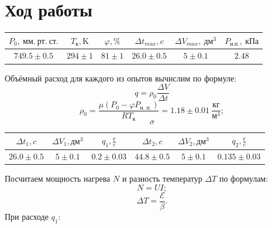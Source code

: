\documentclass[a4paper, 12pt]{article}%
\begin{document}
\section{Ход работы}
\begin{center}

\begin{tabular}{|c|c|c|c|c|c|}
\hline $P_0,\ \text{мм}.\ \text{рт}.\ \text{ст}. $ & $T_{\text{к}}, \text{K}$ & $\varphi, \%$ & $\Delta t_{max}, c$ & $\Delta V_{max},\ \text{дм}^3$ & $P_{\text{н.п.}},\ \text{кПа}$ \\\hline
 $749.5 \pm 0.5$ & $294 \pm 1$ & $81 \pm 1$ & $26.0 \pm 0.5$ & $5 \pm 0.1$ & $2.48$ \\\hline
\end{tabular}
\end{center}
Объёмный расход для каждого из опытов вычислим по формуле:
\[
	q = \rho_0 \frac{\Delta V}{\Delta t}
\]
\[
	\rho_0 = \frac{\mu \left(P_0 - \varphi P_{\text{н. п.}} \right)}{RT_\text{к}} = 1.18 \pm 0.01\ \frac{\text{кг}}{\text{м}^3};
\]
\[
	\sigma
\]

\begin{center}

\begin{tabular}{|c|c|c|c|c|c|}
\hline $\Delta t_1, c$ & $\Delta V_1, \text{дм}^3$ & $q_1, \frac{\text{г}}{c}$ & $\Delta t_2, c$ & $\Delta V_2, \text{дм}^3$ & $q_2, \frac{\text{г}}{c}$ \\\hline
 $26.0 \pm 0.5$ & $5 \pm 0.1$ & $0.2 \pm 0.03$ & $44.8 \pm 0.5$ & $5 \pm 0.1$ & $0.135 \pm 0.03$ \\\hline
\end{tabular}
\end{center}

Посчитаем мощность нагрева $N$ и разность температур $\Delta T$ по формулам:
\[
	N = UI;
\]
\[
	\Delta T = \frac{\mathcal{E}}{\beta}.
\]
При расходе $q_1$:
\end{document}
